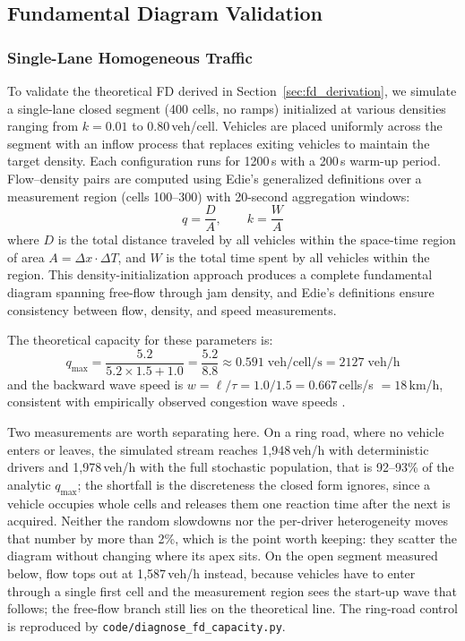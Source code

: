 \documentclass[review,authoryear]{elsarticle}
\begin{document}
\subsection{Fundamental Diagram Validation}
\label{sec:exp_fd}

\subsubsection{Single-Lane Homogeneous Traffic}

To validate the theoretical FD derived in Section~\ref{sec:fd_derivation}, we simulate a single-lane closed segment (400 cells, no ramps) initialized at various densities ranging from $k = 0.01$ to $0.80$\,veh/cell. Vehicles are placed uniformly across the segment with an inflow process that replaces exiting vehicles to maintain the target density. Each configuration runs for 1200\,s with a 200\,s warm-up period. Flow--density pairs are computed using Edie's generalized definitions \citep{edie1963discussion} over a measurement region (cells 100--300) with 20-second aggregation windows:
\begin{equation}
    q = \frac{D}{A}, \qquad k = \frac{W}{A}
    \label{eq:fd_measurement}
\end{equation}
where $D$ is the total distance traveled by all vehicles within the space-time region of area $A = \Delta x \cdot \Delta T$, and $W$ is the total time spent by all vehicles within the region. This density-initialization approach produces a complete fundamental diagram spanning free-flow through jam density, and Edie's definitions ensure consistency between flow, density, and speed measurements.

The theoretical capacity for these parameters is:
\begin{equation}
    q_{\max} = \frac{5.2}{5.2 \times 1.5 + 1.0} = \frac{5.2}{8.8} \approx 0.591\;\text{veh/cell/s} = 2127\;\text{veh/h}
\end{equation}
and the backward wave speed is $w = \ell/\tau = 1.0/1.5 = 0.667$\,cells/s $= 18$\,km/h, consistent with empirically observed congestion wave speeds \citep{cassidy1998bivariate}.

Two measurements are worth separating here. On a ring road, where no vehicle enters or leaves, the simulated stream reaches 1{,}948\,veh/h with deterministic drivers and 1{,}978\,veh/h with the full stochastic population, that is 92--93\% of the analytic $q_{\max}$; the shortfall is the discreteness the closed form ignores, since a vehicle occupies whole cells and releases them one reaction time after the next is acquired. Neither the random slowdowns nor the per-driver heterogeneity moves that number by more than 2\%, which is the point worth keeping: they scatter the diagram without changing where its apex sits. On the open segment measured below, flow tops out at 1{,}587\,veh/h instead, because vehicles have to enter through a single first cell and the measurement region sees the start-up wave that follows; the free-flow branch still lies on the theoretical line. The ring-road control is reproduced by \texttt{code/diagnose\_fd\_capacity.py}.
\end{document}
